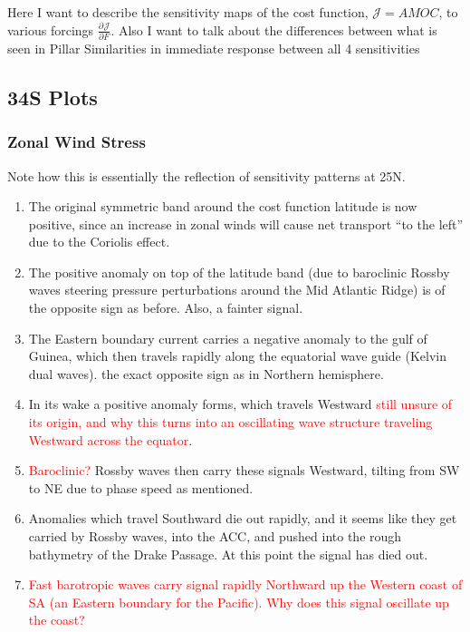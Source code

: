 \documentclass[a4paper,11pt]{article}
\newcommand{\pderiv}[3][]{%
  \ensuremath{\frac{\partial^{#1} {#2}}{\partial {#3}^{#1}}}}
\newcommand{\red}[1]{\textcolor{red}{#1}}
\begin{document}
  Here I want to describe the sensitivity maps of the cost function, $\mathcal{J} = AMOC$, to various forcings $\pderiv{\mathcal{J}}{F}$. 
  Also I want to talk about the differences between what is seen in Pillar 
  Similarities in immediate response between all 4 sensitivities 
  

   \subsection{34S Plots}
   \subsubsection{Zonal Wind Stress}
	Note how this is essentially the reflection of sensitivity patterns at 25N. 
    \begin{enumerate}
	\item The original symmetric band around the cost function latitude is now positive, since an increase in zonal winds will cause net transport ``to the left'' due to the Coriolis effect. 
	\item The positive anomaly on top of the latitude band (due to baroclinic Rossby waves steering pressure perturbations around the Mid Atlantic Ridge) is of the opposite sign as before. Also, a fainter signal. 
	\item The Eastern boundary current carries a negative anomaly to the gulf of Guinea, which then travels rapidly along the equatorial wave guide (Kelvin dual waves). the exact opposite sign as in Northern hemisphere.
	\item In its wake a positive anomaly forms, which travels Westward \red{still unsure of its origin, and why this turns into an oscillating wave structure traveling Westward across the equator}. 
	\item \red{Baroclinic?} Rossby waves then carry these signals Westward, tilting from SW to NE due to phase speed as mentioned.
	\item Anomalies which travel Southward die out rapidly, and it seems like they get carried by Rossby waves, into the ACC, and pushed into the rough bathymetry of the Drake Passage. At this point the signal has died out. 
	\item \red{Fast barotropic waves carry signal rapidly Northward up the Western coast of SA (an Eastern boundary for the Pacific). Why does this signal oscillate up the coast?} 
    \end{enumerate}
\end{document}
